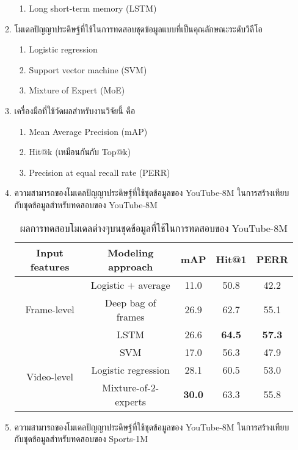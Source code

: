 \begin{enumerate}
\begin{enumerate}
\begin{enumerate}
				\item Long short-term memory (LSTM)
			\end{enumerate}
		\item โมเดลปัญญาประดิษฐ์ที่ใช้ในการทดสอบชุดข้อมูลแบบที่เป็นคุณลักษณะระดับวิดีโอ
			\begin{enumerate}
				\setlength\itemsep{-0.25em}
				\item Logistic regression
				\item Support vector machine (SVM)
				\item Mixture of Expert (MoE)
			\end{enumerate}
		\item เครื่องมือที่ใช้วัดผลสำหรับงานวิจัยนี้ คือ
			\begin{enumerate}
				\setlength\itemsep{-0.25em}
				\item Mean Average Precision (mAP)
				\item Hit@k (เหมือนกันกับ Top@k)
				\item Precision at equal recall rate (PERR)
			\end{enumerate}
		\item ความสามารถของโมเดลปัญญาประดิษฐ์ที่ใช้ชุดข้อมูลของ YouTube-8M ในการสร้างเทียบกับชุดข้อมูลสำหรับทดสอบของ YouTube-8M
			\begin{table}[!ht]
				\centering
				\begin{tabular}{|c|c|c|c|c|}
					\hline
					{Input features} & {Modeling approach} & {mAP} & Hit@1 & PERR\\
					\hline
					\multirow{3}{*}{Frame-level} & Logistic + average & 11.0 & 50.8 & 42.2\\
					& Deep bag of frames & 26.9 & 62.7 & 55.1\\
					& LSTM & 26.6 & \textbf{64.5} & \textbf{57.3}\\
					\hline
					\multirow{3}{*}{Video-level} & SVM & 17.0 & 56.3 & 47.9\\
					& Logistic regression & 28.1 & 60.5 & 53.0\\
					& Mixture-of-2-experts & \textbf{30.0} & 63.3 & 55.8\\
					\hline
				\end{tabular}
				\caption{ผลการทดสอบโมเดลต่างๆบนชุดข้อมูลที่ใช้ในการทดสอบของ YouTube-8M}
				\label{tab: youtube_youtube}
			\end{table}
			\item ความสามารถของโมเดลปัญญาประดิษฐ์ที่ใช้ชุดข้อมูลของ YouTube-8M ในการสร้างเทียบกับชุดข้อมูลสำหรับทดสอบของ Sports-1M
			\begin{table}[!ht]

\end{table}
\end{enumerate}
\end{enumerate}
